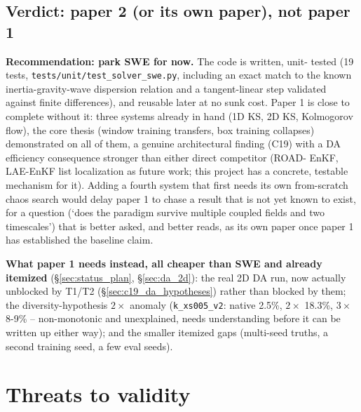 \documentclass[11pt]{article}
\begin{document}
\subsection{Verdict: paper 2 (or its own paper), not paper 1}

\textbf{Recommendation: park SWE for now.} The code is written, unit-
tested (19 tests, \texttt{tests/unit/test\_solver\_swe.py}, including an
exact match to the known inertia-gravity-wave dispersion relation and a
tangent-linear step validated against finite differences), and reusable
later at no sunk cost. Paper 1 is close to complete without it: three
systems already in hand (1D KS, 2D KS, Kolmogorov flow), the core
thesis (window training transfers, box training collapses) demonstrated
on all of them, a genuine architectural finding (C19) with a DA
efficiency consequence stronger than either direct competitor (ROAD-
EnKF, LAE-EnKF list localization as future work; this project has a
concrete, testable mechanism for it). Adding a fourth system that first
needs its own from-scratch chaos search would delay paper 1 to chase a
result that is not yet known to exist, for a question (`does the
paradigm survive multiple coupled fields and two timescales') that is
better asked, and better reads, as its own paper once paper 1 has
established the baseline claim.

\textbf{What paper 1 needs instead, all cheaper than SWE and already
itemized} (\S\ref{sec:status_plan}, \S\ref{sec:da_2d}): the real 2D DA
run, now actually unblocked by T1/T2
(\S\ref{sec:c19_da_hypotheses}) rather than blocked by them; the
diversity-hypothesis $2\times$ anomaly (\texttt{k\_xs005\_v2}: native
2.5\%, $2\times$ 18.3\%, $3\times$ 8-9\% -- non-monotonic and
unexplained, needs understanding before it can be written up either
way); and the smaller itemized gaps (multi-seed truths, a second
training seed, a few eval seeds).

\section{Threats to validity}
\label{sec:threats}
\end{document}
